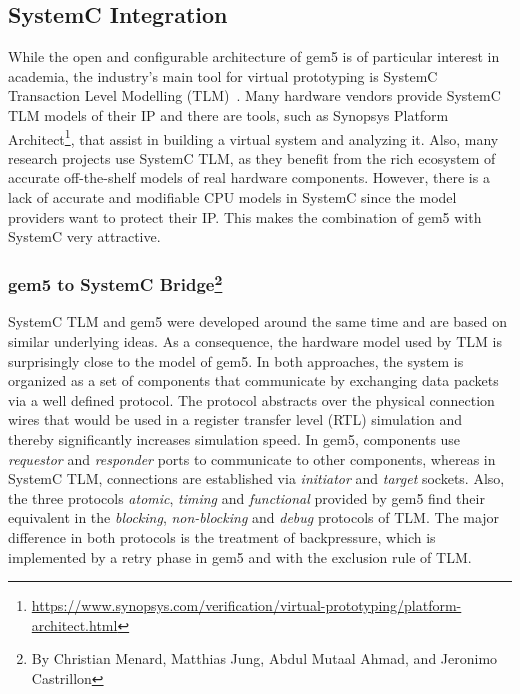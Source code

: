 \subsection[SystemC Integration]{SystemC Integration}

While the open and configurable architecture of gem5 is of particular interest
in academia, the industry's main tool for virtual prototyping is SystemC
Transaction Level Modelling (TLM)~\cite{systemc_ieee11}. Many hardware vendors
provide SystemC TLM models of their IP and there are tools, such as Synopsys
Platform Architect\footnote{\url{https://www.synopsys.com/verification/virtual-prototyping/platform-architect.html}},
that assist in building a virtual system and analyzing it. Also, many research
projects use SystemC TLM, as they benefit from the rich ecosystem of accurate
off-the-shelf models of real hardware components. However, there is a lack of
accurate and modifiable CPU models in SystemC since the model providers want to
protect their IP. This makes the combination of gem5 with SystemC very
attractive.

\subsubsection[gem5 to SystemC Bridge]{gem5 to SystemC Bridge\footnote{By Christian Menard, Matthias Jung, Abdul Mutaal Ahmad, and Jeronimo Castrillon}}

SystemC TLM and gem5 were developed around the same time and are based on
similar underlying ideas. As a consequence, the hardware model used by TLM is
surprisingly close to the model of gem5. In both approaches, the system is
organized as a set of components that communicate by exchanging data packets
via a well defined protocol. The protocol abstracts over the physical
connection wires that would be used in a register transfer level (RTL)
simulation and thereby significantly increases simulation speed. In gem5,
components use \emph{requestor} and \emph{responder} ports to communicate to other
components, whereas in SystemC TLM, connections are established via
\emph{initiator} and \emph{target} sockets. Also, the three protocols
\emph{atomic}, \emph{timing} and \emph{functional} provided by gem5 find their
equivalent in the \emph{blocking}, \emph{non-blocking} and \emph{debug}
protocols of TLM. The major difference in both protocols is the treatment of
backpressure, which is implemented by a retry phase in gem5 and with the
exclusion rule of TLM.

